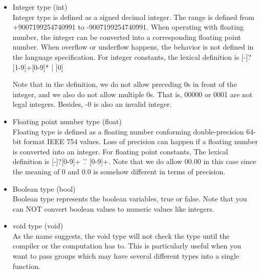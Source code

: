 \documentclass[11pt,letterpaper]{article}
\begin{document}
\begin{itemize}
\item Integer type (int) \\
Integer type is defined as a signed decimal integer. The range is defined from +9007199254740991 to -9007199254740991. When operating with floating number, the integer can be converted into a corresponding floating point number. When overflow or underflow happens, the behavior is not defined in the language specification. For integer constants, the lexical definition is [-]?[1-9]+[0-9]* | [0]

Note that in the definition, we do not allow preceding 0s in front of the integer, and we also do not allow multiple 0s. That is, 00000 or 0001 are not legal integers. Besides, -0 is also an invalid integer.

\item Floating point number type (float) \\
Floating type is defined as a floating number conforming double-precision 64-bit format IEEE 754 values. Loss of precision can happen if a floating number is converted into an integer. For floating point constants, The lexical definition is [-]?[0-9]+ '.' [0-9]+. Note that we do allow 00.00 in this case since the meaning of 0 and 0.0 is somehow different in terms of precision.

\item Boolean type (bool) \\
Boolean type represents the boolean variables, true or false. Note that you can NOT convert boolean values to numeric values like integers.

\item void type (void) \\
As the name suggests, the void type will not check the type until the compiler or the computation has to. This is particularly useful when you want to pass groups which may have several different types into a single function.
\end{itemize}
\end{document}
